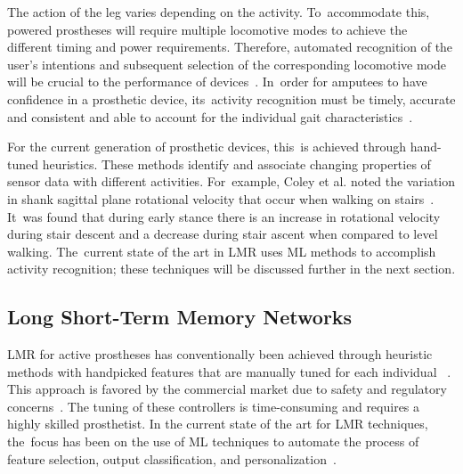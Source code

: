 The action of the leg varies depending on the activity. To~accommodate this, powered prostheses will require multiple locomotive modes to achieve the different timing and power requirements. Therefore, automated recognition of the user's intentions and subsequent selection of the corresponding locomotive mode will be crucial to the performance of devices~\cite{Tucker2015, Windrich2016, Zhang2015}. In~order for amputees to have confidence in a prosthetic device, its~activity recognition must be timely, accurate and consistent and able to account for the individual gait characteristics~\cite{Pedroli2019, Sinha2011, Ponce2016}.

For the current generation of prosthetic devices, this~is achieved through hand-tuned heuristics. These methods identify and associate changing properties of sensor data with different activities. For~example, Coley et al. noted the variation in shank sagittal plane rotational velocity that occur when walking on stairs~\cite{Coley2005}. It~was found that during early stance there is an increase in rotational velocity during stair descent and a decrease during stair ascent when compared to level walking. The~current state of the art in LMR uses ML methods to accomplish activity recognition; these techniques will be discussed further in the next section.

\subsection{Long Short-Term Memory Networks}
\label{sec:lstm_therory}
LMR for active prostheses has conventionally been achieved through heuristic methods with handpicked features that are manually tuned for each individual ~\cite{Maqbool2017, Xu2018}. This approach is favored by the commercial market due to safety and regulatory concerns~\cite{Fluit2020}.  The tuning of these controllers is time-consuming and requires a highly skilled prosthetist. In the current state of the art for LMR techniques, the~focus has been on the use of ML techniques to automate the process of feature selection, output classification, and personalization~\cite{Labarriere2020}.

